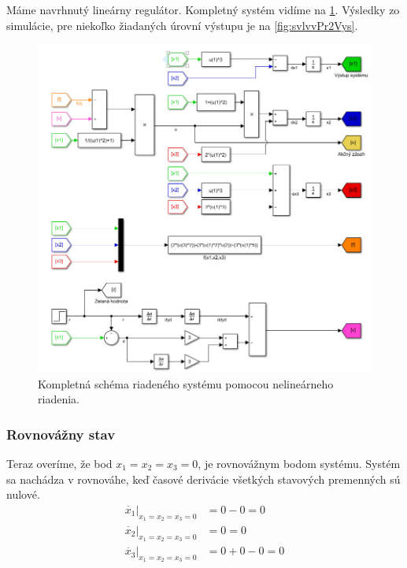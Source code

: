 \documentclass[../main.tex]{subfiles}
\begin{document}
	Máme navrhnutý lineárny regulátor. Kompletný systém vidíme na \cref{fig:svlvvPr2All}.  Výsledky zo simulácie, pre niekoľko žiadaných úrovní výstupu je na \cref{fig:svlvvPr2Vys}.
	\begin{figure}[h!]
		\centering
		\includegraphics[width=\linewidth]{sysPr2complet}
		\caption{Kompletná schéma riadeného systému pomocou nelineárneho riadenia.}
		\label{fig:svlvvPr2All}
	\end{figure}
    \subsubsection{Rovnovážny stav}
	Teraz overíme, že bod  $x_1 = x_2 = x_3 = 0 $, je rovnovážnym bodom systému. Systém sa nachádza v rovnováhe, keď časové derivácie všetkých stavových premenných sú nulové. 
	\begin{equation}
		\begin{aligned}
		\dot{x_1}|_{x_1 = x_2 = x_3 = 0} &= 0 - 0 = 0 \\
		\dot{x_2}|_{x_1 = x_2 = x_3 = 0} &= 0    = 0 \\
		\dot{x_3}|_{x_1 = x_2 = x_3 = 0} &= 0 + 0 - 0 = 0 \\
		\end{aligned}
		\label{eqn:svlvvPr2OvereniePB}
	\end{equation}
	
\end{document}
